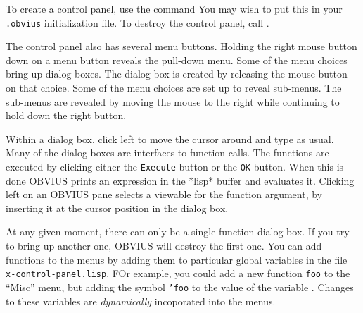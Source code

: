 To create a control panel, use the command 
You may wish to put this in your {\tt .obvius} initialization file.
To destroy the control panel, call .

The control panel also has several menu buttons.  Holding the right
mouse button down on a menu button reveals the pull-down menu.  Some
of the menu choices bring up dialog boxes.  The dialog box is created
by releasing the mouse button on that choice.  Some of the menu
choices are set up to reveal sub-menus.  The sub-menus are revealed by
moving the mouse to the right while continuing to hold down the right
button.

Within a dialog box, click left to move the cursor around and type as
usual.  Many of the dialog boxes are interfaces to function calls.
The functions are executed by clicking either the {\tt Execute} button
or the {\tt OK} button.  When this is done OBVIUS prints an expression
in the *lisp* buffer and evaluates it.  Clicking left on an OBVIUS
pane selects a viewable for the function argument, by inserting it at
the cursor position in the dialog box.

At any given moment, there can only be a single function dialog box.
If you try to bring up another one, OBVIUS will destroy the first one.
You can add functions to the menus by adding them to particular global
variables in the file {\tt x-control-panel.lisp}.  FOr example, you
could add a new function {\tt foo} to the  ``Misc'' menu, but adding
the symbol {\tt 'foo} to the value of the variable
. Changes to these
variables are {\em dynamically} incoporated into the menus.

